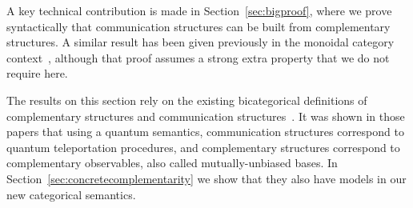 \documentclass[a4paper,12pt]{article}
\theoremstyle{definition}
\renewcommand{\-}[0]{\nobreakdash-\hspace{0pt}}
\begin{document}
A key technical  contribution is made in Section~\ref{sec:bigproof}, where we prove syntactically that communication structures can be built from complementary structures. A similar result has been given previously in the monoidal category context~\cite{cd11-iqo}, although that proof assumes a strong extra property that we do not require here.

The results on this section rely on the existing bicategorical definitions of complementary structures and communication structures~\cite{v12-hqt,v12-hsqp}. It was shown in those papers that using a quantum semantics, communication structures correspond to quantum teleportation procedures, and complementary structures correspond to complementary observables, also called mutually-unbiased bases. In Section~\ref{sec:concretecomplementarity} we show that they also have models in our new categorical semantics.
\end{document}
